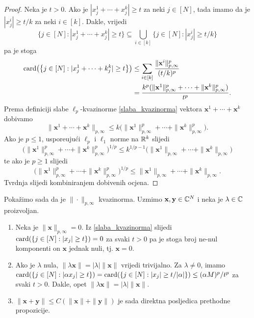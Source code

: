 \documentclass[a4paper,twoside,12pt]{memoir} %
\newcommand{\vect}[1]{\mathbf{#1}}
\renewcommand{\vec}{\vect}
\newcommand{\card}{\text{\normalfont{card}}}
\newcommand{\norm}[1]{\|{#1}\|}
\begin{document}
\begin{proof}
    Neka je $t>0$. Ako je $|x_j^1+\cdots+x_j^k|\geq t$ za neki $j\in [N]$, tada imamo da je $|x_j^i|\geq t/k$ za neki $i \in [k]$. Dakle, vrijedi
    \begin{equation*}
        \big\{ j\in [N]:|x_j^1+\cdots+x_j^k| \geq t \big\} \subseteq \bigcup\limits_{i\in [k]} \big \{ j \in [N] : |x_j^i| \geq t/k \big \}
    \end{equation*}
    pa je stoga
    \begin{align*}
        \card\big( \big\{ j\in [N] : |x_j^1+\cdots+k_j^k| \geq t \big\}\big)&\leq\sum\limits_{i\in [k]}\frac{\|\vec{x}^i\|^p_{p, \infty}}{(t/k)^p} \\ 
                                                                            &= \frac{k^p(\|\vec{x}^1\|^p_{p, \infty}+\cdots + \|\vec{x}^k\|^p_{p, \infty})}{t^p}.
    \end{align*}
    Prema definiciji slabe $\ell_p$-kvazinorme \eqref{slaba_kvazinorma} vektora $\vec{x}^1+\cdots+\vec{x}^k$ dobivamo
    \begin{equation*}
        \|\vec{x}^1+\cdots+\vec{x}^k\|_{p, \infty}\leq k\big(\|\vec{x}^1\|^p_{p,\infty}+ \cdots +\|\vec{x}^k\|^p_{p,\infty}\big).
    \end{equation*}
    Ako je $p \leq 1$, uspore\dj uju\'ci $\ell_p$ i $\ell_1$ norme na $\mathbb{R}^k$ slijedi
    \begin{equation*}
        \big(\|\vec{x}^1\|^p_{p,\infty}+ \cdots +\|\vec{x}^k\|^p_{p,\infty}\big)^{1/p} \leq k^{1/p-1}\big(\|\vec{x}^1\|_{p,\infty}+ \cdots +\|\vec{x}^k\|_{p,\infty}\big)
    \end{equation*}
    te ako je $p \geq 1$ slijedi
    \begin{equation*}
        \big(\|\vec{x}^1\|^p_{p,\infty}+ \cdots +\|\vec{x}^k\|^p_{p,\infty}\big)^{1/p} \leq \|\vec{x}^1\|_{p,\infty}+ \cdots +\|\vec{x}^k\|_{p,\infty}.
    \end{equation*}
    Tvrdnja slijedi kombiniranjem dobivenih ocjena.
\end{proof}

\noindent
Poka\v{z}imo sada da je $\norm{\cdot}_{p, \infty}$ kvazinorma. Uzmimo $\vec{x}, \vec{y} \in \C^N$ i neka je $\lambda \in \mathbb{C}$ proizvoljan.

\begin{enumerate}
    \item Neka je $\|\vec{x}\|_{p, \infty}=0$. Iz \eqref{slaba_kvazinorma} slijedi $ \card(\{j \in [N]: |x_j| \geq t\}) = 0$ za svaki $t > 0$ pa je stoga broj ne-nul komponenti on $\vec{x}$ jednak nuli, tj. $\vec{x}=0$.
    \item Ako je $\lambda$ nula, $\|\lambda \vec{x}\| = | \lambda | \| \vec{x} \|$ vrijedi trivijalno. Za $\lambda \neq 0$, imamo \\
        $\card(\{ j \in [N]: |\alpha x_j| \geq t \}) = \card(\{ j \in [N]: |x_j| \geq t/|\alpha| \})\leq (\alpha M)^p/t^p$ za svaki $t>0$. Dakle, opet $\|\lambda \vec{x}\| = | \lambda | \| \vec{x} \|$.
    \item $\|\vec{x}+\vec{y}\|\leq C(\|\vec{x}\|+\|\vec{y}\|)$ je sada direktna posljedica prethodne propozicije.
\end{enumerate}
\end{document}
